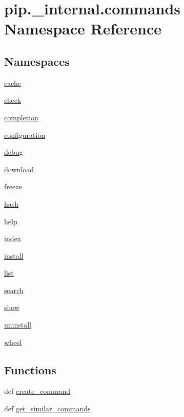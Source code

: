 \hypertarget{namespacepip_1_1__internal_1_1commands}{}\section{pip.\+\_\+internal.\+commands Namespace Reference}
\label{namespacepip_1_1__internal_1_1commands}
\subsection*{Namespaces}
\begin{DoxyCompactItemize}
\item 
 \hyperlink{namespacepip_1_1__internal_1_1commands_1_1cache}{cache}
\item 
 \hyperlink{namespacepip_1_1__internal_1_1commands_1_1check}{check}
\item 
 \hyperlink{namespacepip_1_1__internal_1_1commands_1_1completion}{completion}
\item 
 \hyperlink{namespacepip_1_1__internal_1_1commands_1_1configuration}{configuration}
\item 
 \hyperlink{namespacepip_1_1__internal_1_1commands_1_1debug}{debug}
\item 
 \hyperlink{namespacepip_1_1__internal_1_1commands_1_1download}{download}
\item 
 \hyperlink{namespacepip_1_1__internal_1_1commands_1_1freeze}{freeze}
\item 
 \hyperlink{namespacepip_1_1__internal_1_1commands_1_1hash}{hash}
\item 
 \hyperlink{namespacepip_1_1__internal_1_1commands_1_1help}{help}
\item 
 \hyperlink{namespacepip_1_1__internal_1_1commands_1_1index}{index}
\item 
 \hyperlink{namespacepip_1_1__internal_1_1commands_1_1install}{install}
\item 
 \hyperlink{namespacepip_1_1__internal_1_1commands_1_1list}{list}
\item 
 \hyperlink{namespacepip_1_1__internal_1_1commands_1_1search}{search}
\item 
 \hyperlink{namespacepip_1_1__internal_1_1commands_1_1show}{show}
\item 
 \hyperlink{namespacepip_1_1__internal_1_1commands_1_1uninstall}{uninstall}
\item 
 \hyperlink{namespacepip_1_1__internal_1_1commands_1_1wheel}{wheel}
\end{DoxyCompactItemize}
\subsection*{Functions}
\begin{DoxyCompactItemize}
\item 
def \hyperlink{namespacepip_1_1__internal_1_1commands_a47ea9893916b8604fc2ac555703b0670}{create\+\_\+command}
\item 
def \hyperlink{namespacepip_1_1__internal_1_1commands_aa76da06e703ecf6a505bcd08f64bc808}{get\+\_\+similar\+\_\+commands}
\end{DoxyCompactItemize}
